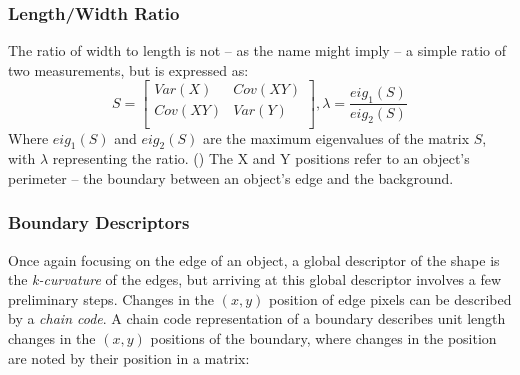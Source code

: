 \documentclass[letterpaper]{article}
\begin{document}
{{\subsubsection{Length/Width Ratio}
\label{sec:width-length-ratio}
The ratio of width to length is not -- as the name might imply -- a simple ratio of two measurements, but is expressed as:
\begin{equation}
S = 
	\begin{bmatrix}
	Var(X) & Cov(XY) \\[0.3em]
	Cov(XY) & Var(Y) \\[0.3em]
	\end{bmatrix},
\lambda = \frac {eig_{1}(S)} {eig_{2}(S)}
\end{equation}
Where $eig_{1}(S)$ and $eig_{2}(S)$ are the maximum eigenvalues of the matrix $S$, with $\lambda$ representing the ratio. (\cite{Lin2017-xq}) The X and Y positions refer to an object's perimeter -- the boundary between an object's edge and the background.

\subsubsection{Boundary Descriptors}
Once again focusing on the edge of an object, a global descriptor of the shape is the \textit{k-curvature} of the edges, but arriving at this global descriptor involves a few preliminary steps. Changes in the $(x,y)$ position of edge pixels can be described by a \textit{chain code}. A chain code representation of a boundary describes unit length changes in the $(x,y)$ positions of the boundary,  where changes in the position are noted by their position in a matrix:

}}
\end{document}
